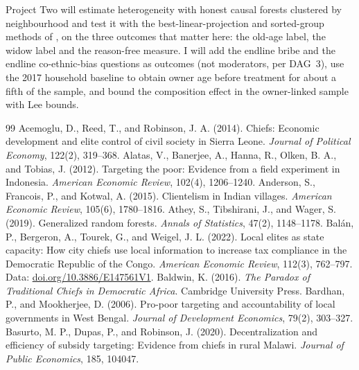 \documentclass[11pt]{article}
\begin{document}
Project Two will estimate heterogeneity with honest causal forests clustered by neighbourhood \citep{wager2018,athey2019} and test it with the best-linear-projection and sorted-group methods of \citet{chernozhukov2018b}, on the three outcomes that matter here: the old-age label, the widow label and the reason-free measure. I will add the endline bribe and the endline co-ethnic-bias questions as outcomes (not moderators, per DAG~3), use the 2017 household baseline to obtain owner age before treatment for about a fifth of the sample, and bound the composition effect in the owner-linked sample with Lee bounds.

\begin{thebibliography}{99}\small\setlength{\itemsep}{1pt}
 Acemoglu, D., Reed, T., and Robinson, J. A. (2014). Chiefs: Economic development and elite control of civil society in Sierra Leone. \textit{Journal of Political Economy}, 122(2), 319--368.
 Alatas, V., Banerjee, A., Hanna, R., Olken, B. A., and Tobias, J. (2012). Targeting the poor: Evidence from a field experiment in Indonesia. \textit{American Economic Review}, 102(4), 1206--1240.
 Anderson, S., Francois, P., and Kotwal, A. (2015). Clientelism in Indian villages. \textit{American Economic Review}, 105(6), 1780--1816.
 Athey, S., Tibshirani, J., and Wager, S. (2019). Generalized random forests. \textit{Annals of Statistics}, 47(2), 1148--1178.
 Bal\'an, P., Bergeron, A., Tourek, G., and Weigel, J. L. (2022). Local elites as state capacity: How city chiefs use local information to increase tax compliance in the Democratic Republic of the Congo. \textit{American Economic Review}, 112(3), 762--797. Data: \href{https://doi.org/10.3886/E147561V1}{doi.org/10.3886/E147561V1}.
 Baldwin, K. (2016). \textit{The Paradox of Traditional Chiefs in Democratic Africa}. Cambridge University Press.
 Bardhan, P., and Mookherjee, D. (2006). Pro-poor targeting and accountability of local governments in West Bengal. \textit{Journal of Development Economics}, 79(2), 303--327.
 Basurto, M. P., Dupas, P., and Robinson, J. (2020). Decentralization and efficiency of subsidy targeting: Evidence from chiefs in rural Malawi. \textit{Journal of Public Economics}, 185, 104047.

\end{thebibliography}
\end{document}
